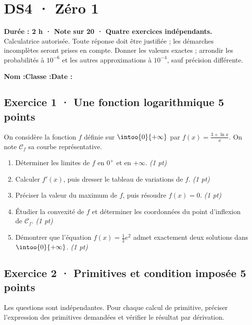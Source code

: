 \mxnewpage{}\label{sujet:6-1}

\section*{DS4 · Zéro 1}


\textbf{Durée : 2 h · Note sur 20 · Quatre exercices indépendants.}\\Calculatrice autorisée. Toute réponse doit être justifiée ; les démarches incomplètes seront prises en compte. Donner les valeurs exactes ; arrondir les probabilités à $10^{-6}$ et les autres approximations à $10^{-4}$, sauf précision différente.

\smallskip\textbf{Nom :}\enspace\dotfill\quad\textbf{Classe :}\enspace\dotfill\quad\textbf{Date :}\enspace\dotfill

\subsection*{Exercice 1 · Une fonction logarithmique \hfill 5 points}On considère la fonction $f$ définie sur $\intoo{0}{+\infty}$ par $f(x)=\frac{3+\ln x}x$. On note $\mathcal C_f$ sa courbe représentative.

\begin{enumerate}

\item Déterminer les limites de $f$ en $0^+$ et en $+\infty$. \hfill\textit{(1 pt)}

\item Calculer $f' (x)$, puis dresser le tableau de variations de $f$. \hfill\textit{(1 pt)}

\item Préciser la valeur du maximum de $f$, puis résoudre $f(x)=0$. \hfill\textit{(1 pt)}

\item Étudier la convexité de $f$ et déterminer les coordonnées du point d'inflexion de $\mathcal C_f$. \hfill\textit{(1 pt)}

\item Démontrer que l'équation $f(x)=\frac12 e^{2}$ admet exactement deux solutions dans $\intoo{0}{+\infty}$. \hfill\textit{(1 pt)}

\end{enumerate}

\subsection*{Exercice 2 · Primitives et condition imposée \hfill 5 points}Les  questions sont indépendantes. Pour chaque calcul de primitive, préciser l'expression des primitives demandées et vérifier le résultat par dérivation.

